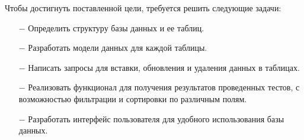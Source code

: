 Чтобы достигнуть поставленной цели, требуется решить следующие задачи: 
\begin{itemize}
    \item[$-$] Определить структуру базы данных и ее таблиц.
    \item[$-$] Разработать модели данных для каждой таблицы.
    \item[$-$] Написать запросы для вставки, обновления и удаления данных в таблицах.
    \item[$-$] Реализовать функционал для получения результатов проведенных тестов, с возможностью фильтрации и сортировки по различным полям.
    \item[$-$] Разработать интерфейс пользователя для удобного использования базы данных. 
\end{itemize}

